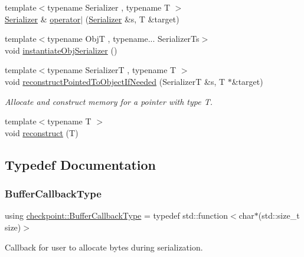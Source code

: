 \begin{DoxyCompactItemize}
\item 
{\footnotesize template$<$typename Serializer , typename T $>$ }\\\hyperlink{structcheckpoint_1_1_serializer}{Serializer} \& \hyperlink{namespacecheckpoint_a5c9a1c4d05ec6880270c9a6d0dded825}{operator$\vert$} (\hyperlink{structcheckpoint_1_1_serializer}{Serializer} \&s, T \&target)
\item 
{\footnotesize template$<$typename ObjT , typename... Serializer\+Ts$>$ }\\void \hyperlink{namespacecheckpoint_a09875c2d3c012be868f3fd88b3ed55be}{instantiate\+Obj\+Serializer} ()
\item 
{\footnotesize template$<$typename SerializerT , typename T $>$ }\\void \hyperlink{namespacecheckpoint_a9ffb72abb4d8c3fe031626dbf526d70c}{reconstruct\+Pointed\+To\+Object\+If\+Needed} (SerializerT \&s, T $\ast$\&target)
\begin{DoxyCompactList}\small\item\em Allocate and construct memory for a pointer with type {\ttfamily T}. \end{DoxyCompactList}\item 
{\footnotesize template$<$typename T $>$ }\\void \hyperlink{namespacecheckpoint_a6254f2e220f905a2b0c797c08092a7a1}{reconstruct} (T)
\end{DoxyCompactItemize}


\subsection{Typedef Documentation}
\mbox{\label{namespacecheckpoint_a70bc1b37eae8e32129df38d981ef90f6}} 
\subsubsection{\texorpdfstring{Buffer\+Callback\+Type}{BufferCallbackType}}
{\footnotesize\ttfamily using \hyperlink{namespacecheckpoint_a70bc1b37eae8e32129df38d981ef90f6}{checkpoint\+::\+Buffer\+Callback\+Type} = typedef std\+::function$<$char$\ast$(std\+::size\+\_\+t size)$>$}



Callback for user to allocate bytes during serialization. 

